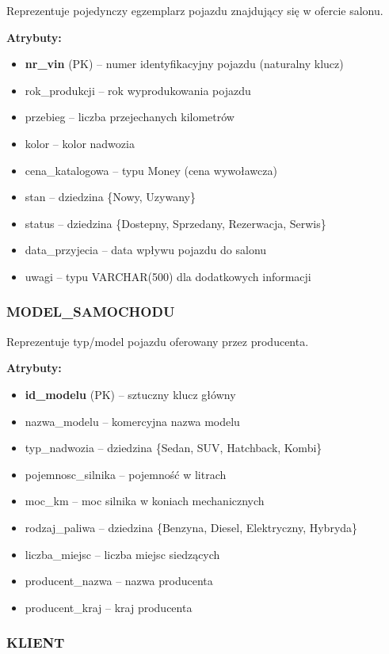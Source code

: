 \documentclass[a4paper,titleauthor]{mwart}
\begin{document}
	Reprezentuje pojedynczy egzemplarz pojazdu znajdujący się w ofercie salonu.
	
	\textbf{Atrybuty:}
	\begin{itemize}
		\item \textbf{nr\_vin} (PK) -- numer identyfikacyjny pojazdu (naturalny klucz)
		\item rok\_produkcji -- rok wyprodukowania pojazdu
		\item przebieg -- liczba przejechanych kilometrów
		\item kolor -- kolor nadwozia
		\item cena\_katalogowa -- typu Money (cena wywoławcza)
		\item stan -- dziedzina \{Nowy, Uzywany\}
		\item status -- dziedzina \{Dostepny, Sprzedany, Rezerwacja, Serwis\}
		\item data\_przyjecia -- data wpływu pojazdu do salonu
		\item uwagi -- typu VARCHAR(500) dla dodatkowych informacji
	\end{itemize}
	
	\subsubsection{MODEL\_SAMOCHODU}
	
	Reprezentuje typ/model pojazdu oferowany przez producenta.
	
	\textbf{Atrybuty:}
	\begin{itemize}
		\item \textbf{id\_modelu} (PK) -- sztuczny klucz główny
		\item nazwa\_modelu -- komercyjna nazwa modelu
		\item typ\_nadwozia -- dziedzina \{Sedan, SUV, Hatchback, Kombi\}
		\item pojemnosc\_silnika -- pojemność w litrach
		\item moc\_km -- moc silnika w koniach mechanicznych
		\item rodzaj\_paliwa -- dziedzina \{Benzyna, Diesel, Elektryczny, Hybryda\}
		\item liczba\_miejsc -- liczba miejsc siedzących
		\item producent\_nazwa -- nazwa producenta
		\item producent\_kraj -- kraj producenta
	\end{itemize}
	
	\subsubsection{KLIENT}
	
\end{document}
